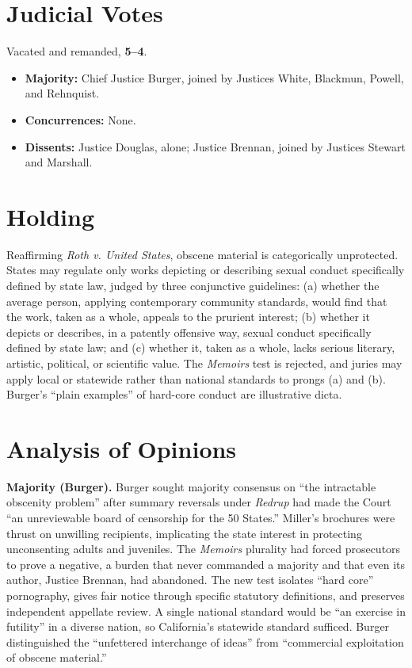 \documentclass[12pt]{article}
\begin{document}
\section{Judicial Votes}

Vacated and remanded, \textbf{5--4}.
\begin{itemize}
\item \textbf{Majority:} Chief Justice Burger, joined by Justices White, Blackmun, Powell, and Rehnquist.
\item \textbf{Concurrences:} None.
\item \textbf{Dissents:} Justice Douglas, alone; Justice Brennan, joined by Justices Stewart and Marshall.
\end{itemize}

\section{Holding}

Reaffirming \textit{Roth v. United States}, obscene material is categorically unprotected. States may regulate only works depicting or describing sexual conduct specifically defined by state law, judged by three conjunctive guidelines: (a) whether the average person, applying contemporary community standards, would find that the work, taken as a whole, appeals to the prurient interest; (b) whether it depicts or describes, in a patently offensive way, sexual conduct specifically defined by state law; and (c) whether it, taken as a whole, lacks serious literary, artistic, political, or scientific value. The \textit{Memoirs} test is rejected, and juries may apply local or statewide rather than national standards to prongs (a) and (b). Burger's ``plain examples'' of hard-core conduct are illustrative dicta.

\section{Analysis of Opinions}

\textbf{Majority (Burger).} Burger sought majority consensus on ``the intractable obscenity problem'' after summary reversals under \textit{Redrup} had made the Court ``an unreviewable board of censorship for the 50 States.'' Miller's brochures were thrust on unwilling recipients, implicating the state interest in protecting unconsenting adults and juveniles. The \textit{Memoirs} plurality had forced prosecutors to prove a negative, a burden that never commanded a majority and that even its author, Justice Brennan, had abandoned. The new test isolates ``hard core'' pornography, gives fair notice through specific statutory definitions, and preserves independent appellate review. A single national standard would be ``an exercise in futility'' in a diverse nation, so California's statewide standard sufficed. Burger distinguished the ``unfettered interchange of ideas'' from ``commercial exploitation of obscene material.''
\end{document}
